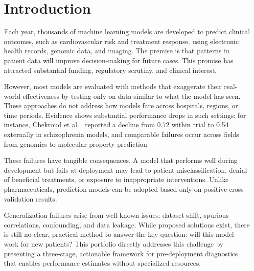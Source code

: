 \section{Introduction}
\thispagestyle{gitfooter}

Each year, thousands of machine learning models are developed to predict clinical outcomes, such as cardiovascular risk and treatment response, using electronic health records, genomic data, and imaging\cite{chekroud2024illusory}. The premise is that patterns in patient data will improve decision-making for future cases. This promise has attracted substantial funding, regulatory scrutiny, and clinical interest.

However, most models are evaluated with methods that exaggerate their real-world effectiveness by testing only on data similar to what the model has seen. These approaches do not address how models fare across hospitals, regions, or time periods. Evidence shows substantial performance drops in such settings: for instance, Chekroud et al.~\cite{chekroud2024illusory} reported a decline from 0.72 within trial to 0.54 externally in schizophrenia models, and comparable failures occur across fields from genomics to molecular property prediction\cite{whalen2022pitfalls, worheide2021shift, springer2021unseen, ektefaie2024spectra}

These failures have tangible consequences. A model that performs well during development but fails at deployment may lead to patient misclassification, denial of beneficial treatments, or exposure to inappropriate interventions. Unlike pharmaceuticals, prediction models can be adopted based only on positive cross-validation results.

Generalization failures arise from well-known issues: dataset shift, spurious correlations, confounding, and data leakage\cite{bendavid2010theory, whalen2022pitfalls}. While proposed solutions exist, there is still no clear, practical method to answer the key question: will this model work for new patients? This portfolio directly addresses this challenge by presenting a three-stage, actionable framework for pre-deployment diagnostics that enables performance estimates without specialized resources.